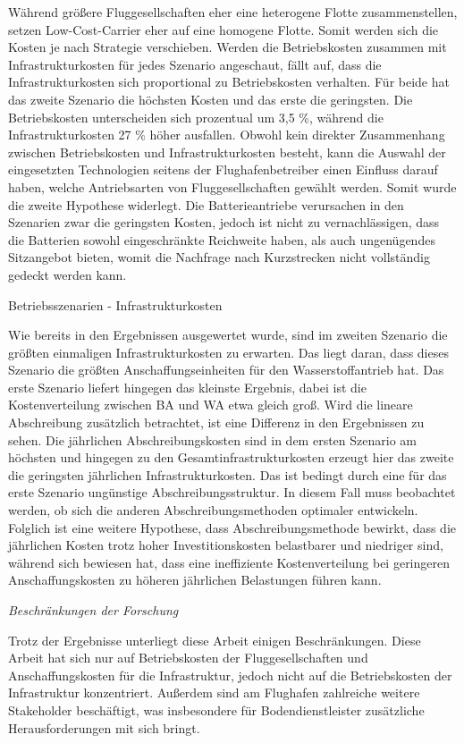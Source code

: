 Während größere Fluggesellschaften eher eine heterogene Flotte zusammenstellen, 
setzen Low-Cost-Carrier eher auf eine homogene Flotte.
Somit werden sich die Kosten je nach Strategie verschieben.
Werden die Betriebskosten zusammen mit Infrastrukturkosten für jedes Szenario angeschaut, fällt auf, 
dass die Infrastrukturkosten sich proportional zu Betriebskosten verhalten. 
Für beide hat das zweite Szenario die höchsten Kosten und das erste die geringsten. 
Die Betriebskosten unterscheiden sich prozentual um 3,5 \%, 
während die Infrastrukturkosten 27 \% höher ausfallen.
Obwohl kein direkter Zusammenhang zwischen Betriebskosten und Infrastrukturkosten besteht, 
kann die Auswahl der eingesetzten Technologien seitens der Flughafenbetreiber einen Einfluss darauf haben, 
welche Antriebsarten von Fluggesellschaften gewählt werden. Somit wurde die zweite Hypothese widerlegt.
Die Batterieantriebe verursachen in den Szenarien zwar die geringsten Kosten,
jedoch ist nicht zu vernachlässigen, dass die Batterien sowohl eingeschränkte Reichweite haben, 
als auch ungenügendes Sitzangebot bieten, womit die Nachfrage nach Kurzstrecken nicht vollständig gedeckt werden kann.

Betriebsszenarien - Infrastrukturkosten

Wie bereits in den Ergebnissen ausgewertet wurde, sind im zweiten Szenario die größten einmaligen Infrastrukturkosten zu erwarten.
Das liegt daran, dass dieses Szenario die größten Anschaffungseinheiten für den Wasserstoffantrieb hat. 
Das erste Szenario liefert hingegen das kleinste Ergebnis, dabei ist die Kostenverteilung zwischen BA und WA etwa gleich groß.
Wird die lineare Abschreibung zusätzlich betrachtet, ist eine Differenz in den Ergebnissen zu sehen. 
Die jährlichen Abschreibungskosten sind in dem ersten Szenario am höchsten 
und hingegen zu den Gesamtinfrastrukturkosten erzeugt hier das zweite die geringsten jährlichen Infrastrukturkosten.
Das ist bedingt durch eine für das erste Szenario ungünstige Abschreibungsstruktur. 
In diesem Fall muss beobachtet werden, ob sich die anderen Abschreibungsmethoden optimaler entwickeln.
Folglich ist eine weitere Hypothese, dass Abschreibungsmethode bewirkt, 
dass die jährlichen Kosten trotz hoher Investitionskosten belastbarer und niedriger sind, 
während sich bewiesen hat, dass eine ineffiziente Kostenverteilung bei geringeren Anschaffungskosten zu 
höheren jährlichen Belastungen führen kann.

\textit{Beschränkungen der Forschung}

Trotz der Ergebnisse unterliegt diese Arbeit einigen Beschränkungen. %
Diese Arbeit hat sich nur auf Betriebskosten der Fluggesellschaften und Anschaffungskosten für die Infrastruktur,
jedoch nicht auf die Betriebskosten der Infrastruktur konzentriert. 
Außerdem sind am Flughafen zahlreiche weitere Stakeholder beschäftigt, 
was insbesondere für Bodendienstleister zusätzliche Herausforderungen mit sich bringt.

